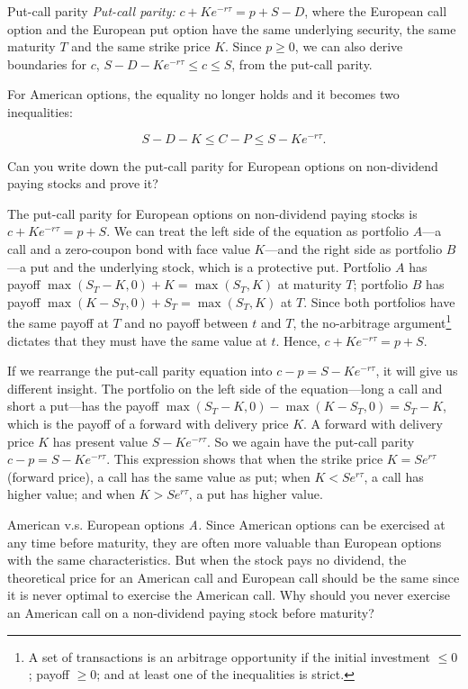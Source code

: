 \begin{problem}{Put-call parity}
\emph{Put-call parity:} $c+Ke^{-r\tau}=p+S-D$, where the European call option and the European
put option have the same underlying security, the same maturity $T$ and the same strike
price $K$. Since $p\geq0$, we can also derive boundaries for $c$, $S-D-Ke^{-r\tau}\leq c\leq S$,
from the put-call parity.

For American options, the equality no longer holds and it becomes two inequalities:

\[
S-D-K\leq C-P\leq S-Ke^{-r\tau}.
\]

Can you write down the put-call parity for European options on non-dividend paying
stocks and prove it?
\end{problem}

\begin{solution}
The put-call parity for European options on non-dividend paying stocks is
$c+Ke^{-r\tau}=p+S$. We can treat the left side of the equation as portfolio $A$---a call and a
zero-coupon bond with face value $K$---and the right side as portfolio $B$---a put and the
underlying stock, which is a protective put. Portfolio $A$ has payoff
$\max(S_T-K,0)+K=\max(S_T,K)$ at maturity $T$; portfolio $B$ has payoff
$\max(K-S_T,0)+S_T=\max(S_T,K)$ at $T$. Since both portfolios have the same payoff at $T$
and no payoff between $t$ and $T$, the no-arbitrage argument\footnote[3]{A set of
transactions is an arbitrage opportunity if the initial investment $\leq0$; payoff $\geq0$;
and at least one of the inequalities is strict.} dictates that they must have the same value
at $t$. Hence, $c+Ke^{-r\tau}=p+S$.

If we rearrange the put-call parity equation into $c-p=S-Ke^{-r\tau}$, it will give us different
insight. The portfolio on the left side of the equation---long a call and short a put---has
the payoff $\max(S_T-K,0)-\max(K-S_T,0)=S_T-K$, which is the payoff of a forward
with delivery price $K$. A forward with delivery price $K$ has present value $S-Ke^{-r\tau}$.
So we again have the put-call parity $c-p=S-Ke^{-r\tau}$. This expression shows that when
the strike price $K=Se^{r\tau}$ (forward price), a call has the same value as put; when
$K<Se^{r\tau}$, a call has higher value; and when $K>Se^{r\tau}$, a put has higher value.
\end{solution}

\begin{problem}{American v.s. European options}
\emph{A.} Since American options can be exercised at any time before maturity, they are
often more valuable than European options with the same characteristics. But when the stock
pays no dividend, the theoretical price for an American call and European call should be the
same since it is never optimal to exercise the American call. Why should you never exercise
an American call on a non-dividend paying stock before maturity?
\end{problem}

